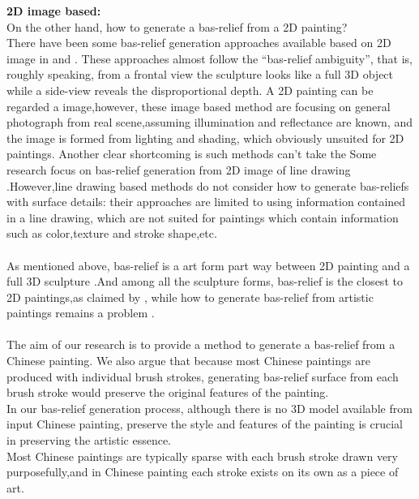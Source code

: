 \textbf{2D image based:}\\On the other hand, how to generate a bas-relief from a 2D painting? \\ There have been some bas-relief generation approaches available based on 2D image in\cite{zeng2014region}\cite{wu2013making} and \cite{alexa2010reliefs}. These approaches almost follow the “bas-relief ambiguity”\cite{belhumeur1999bas}, that is, roughly speaking, from a frontal view the sculpture looks like a full 3D object while a side-view reveals the disproportional depth. 
A 2D painting can be regarded a image,however, these image based method are focusing on general photograph from real scene,assuming illumination and reflectance are known, and the image is formed from lighting and shading, which obviously unsuited for 2D paintings. Another clear shortcoming is such methods can’t take the
Some research focus on bas-relief generation from 2D image of line drawing \cite{kolomenkin2011reconstruction}\cite{varley2002estimating}\cite{malik1987interpreting}\cite{sykora2014ink}.However,line drawing based methods do not consider how to generate bas-reliefs with surface details: their approaches are limited to using information contained in a line drawing, which are not suited for paintings which contain information such as color,texture and stroke shape,etc. \\ \\ 
As mentioned above, bas-relief is a art form part way between 2D painting and a full 3D sculpture\cite{benzaid2017analysis}\cite{weyrich2007digital}\cite{kerber2009feature}\cite{kerber2012computer}\cite{zeng2014region} .And among all the sculpture forms, bas-relief is the closest to 2D paintings,as claimed by \cite{kerber2009feature} \cite{barron2012color}, while how to generate bas-relief from artistic paintings remains a problem . \\ \\  
The aim of our research is to provide a method to generate a bas-relief from a Chinese painting. We also argue that because most Chinese paintings are produced with individual brush strokes, generating bas-relief surface from each brush stroke would preserve the original features of the painting.\\
In our bas-relief generation process, although there is no 3D model available from input Chinese painting, preserve the style and features of the painting is crucial in preserving the artistic essence.\\ 
Most Chinese paintings are typically sparse with each brush stroke drawn very purposefully\cite{smith1997art},and in Chinese painting each stroke exists on its own as a piece of art\cite{girshick2004simulating}.
